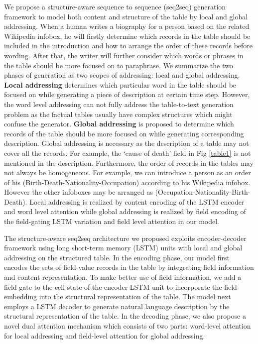 \documentclass[letterpaper]{article} %
\begin{document}
We propose a structure-aware sequence to sequence (seq2seq) generation framework to model both content and structure of the table by local and global addressing. 
When a human writes a biography for a person based on the related Wikipedia infobox, he will firstly determine which records in the table should be included in the introduction and how to arrange the order of these records before wording. 
After that, the writer will further consider which words or phrases in the table should be more focused on to paraphrase.
We summarize the two phases of generation as two scopes of addressing: local and global addressing.
\textbf{Local addressing} determines which particular word in the table should be focused on while generating a piece of description at certain time step. 
However, the word level addressing can not fully address the table-to-text generation problem as the factual tables usually have complex structures which might confuse the generator.
\textbf{Global addressing} is proposed to determine which records of the table should be more focused on while generating corresponding description.
Global addressing is necessary as the description of a table may not cover all the records. For example, the `cause of death' field in Fig \ref{table1} is not mentioned in the description.
Furthermore, the order of records in the tables may not always be homogeneous. For example, we can introduce a person as an order of his (Birth-Death-Nationality-Occupation) according to his Wikipedia infobox. However the other infoboxes may be arranged as (Occupation-Nationality-Birth-Death).
Local addressing is realized by content encoding of the LSTM encoder and word level attention 
while global addressing is realized by field encoding of the field-gating LSTM variation and field level attention in our model.


The structure-aware seq2seq architecture we proposed exploits encoder-decoder framework using long short-term memory (LSTM) \cite{hochreiter1997long} units with local and global addressing on the structured table.   
In the encoding phase, our model first encodes the sets of field-value records in the table by integrating field information and content representation.
To make better use of field information, we add a field gate to the cell state of the encoder LSTM unit to incorporate the field embedding into the structural representation of the table.
The model next employs a LSTM decoder to generate natural language description by the structural representation of the table.
In the decoding phase, we also propose a novel dual attention mechanism which consists of two parts: word-level attention for local addressing and field-level attention for global addressing.
\end{document}
